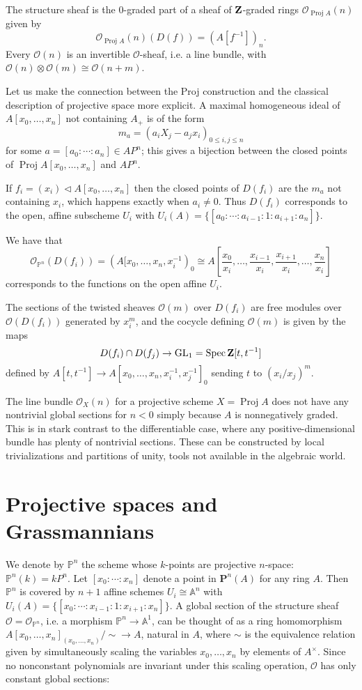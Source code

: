 \documentclass[a4paper,openany]{scrbook}
\DeclareMathOperator{\Proj}{Proj}
\newcommand{\Reg}[1]{\mathcal O_{#1}}
\begin{document}
The structure sheaf is the $0$-graded part of a sheaf of $\mathbf Z$-graded rings
$\Reg{\Proj A}(n)$ given by
\[
\Reg{\Proj A}(n)(D(f)) = (A[f^{-1}])_n.
\]
Every $\mathcal O(n)$ is an invertible $\mathcal O$-sheaf, i.e. a line bundle, with $\mathcal O(n) \otimes \mathcal O(m) \cong \mathcal O(n+m)$.

Let us make the connection between the Proj construction and the classical description of projective space more explicit. A maximal homogeneous ideal of $A[x_0,\dots,x_n]$ not containing $A_+$ is of the form
\[
m_a = (a_i X_j - a_j x_i)_{0 \leq i,j \leq n}
\]
for some $a=[a_0:\cdots:a_n] \in AP^n$; this gives a bijection between the closed points of $\Proj A[x_0,\dots,x_n]$ and $AP^n$.

If $f_i=(x_i) \triangleleft A[x_0,\dots,x_n]$ then the closed points of $D(f_i)$ are the $m_a$ not containing $x_i$, which happens exactly when $a_i \neq 0$. Thus $D(f_i)$ corresponds to the open, affine subscheme $U_i$ with $U_i(A)= \{[a_0:\cdots:a_{i-1}:1:a_{i+1}:a_n]\}$.

We have that
\[
\Reg{\mathbb P^n}(D(f_i)) = (A[x_0,\dots,x_n,x_i^{-1})_0 \cong A[\frac {x_0}{x_i},\dots,\frac {x_{i-1}}{x_i},\frac {x_{i+1}}{x_i},\dots,\frac{x_n}{x_i}]
\]
corresponds to the functions on the open affine $U_i$.

The sections of the twisted sheaves $\mathcal O(m)$ over $D(f_i)$ are free modules over $\mathcal O(D(f_i))$ generated by $x_i^m$, and the cocycle defining $\mathcal O(m)$ is given by the maps
\[
D(f_i) \cap D(f_j) \to \operatorname{GL}_1 = \operatorname{Spec} \mathbf Z[t,t^{-1}]
\]
defined by $A[t,t^{-1}] \to A[x_0,\dots,x_n,x_i^{-1},x_j^{-1}]_0$ sending $t$ to $(x_i/x_j)^m$.

\begin{remark}
The line bundle $\Reg{X}(n)$ for a projective scheme $X=\Proj A$ does not have any nontrivial global sections for $n<0$ simply because $A$ is nonnegatively graded. This is in stark contrast to the differentiable case, where any positive-dimensional bundle has plenty of nontrivial sections. These can be constructed by local trivializations and partitions of unity, tools not available in the algebraic world.
\end{remark}

\section{Projective spaces and Grassmannians}

We denote by $\mathbb P^n$ the scheme whose $k$-points are projective $n$-space: $\mathbb P^n(k) = kP^n$. Let $[x_0:\cdots:x_n]$ denote a point in $\mathbf P^n(A)$ for any ring $A$. Then $\mathbb P^n$ is covered by $n+1$ affine schemes $U_i \cong \mathbb A^n$ with $U_i(A)=\{[x_0:\cdots:x_{i-1}:1:x_{i+1}:x_n]\}$. A global section of the structure sheaf $\mathcal O=\Reg{\mathbb P^n}$, i.e. a morphism $\mathbb P^n \to \mathbb A^1$, can be thought of as a ring homomorphism $A[x_0,\dots,x_n]_{(x_0,\dots,x_n)}/\sim \to A$, natural in $A$, where $\sim$ is the equivalence relation given by simultaneously scaling the variables $x_0,\dots,x_n$ by elements of $A^\times$. Since no nonconstant polynomials are invariant under this scaling operation, $\mathcal O$ has only constant global sections: 
\end{document}
